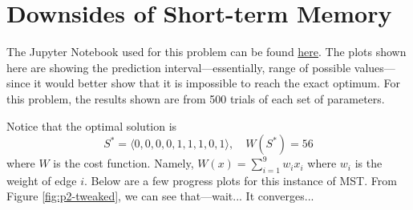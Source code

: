 \section{Downsides of Short-term Memory}

The Jupyter Notebook used for this problem can be found \href{https://github.com/nngerncham/ma395_heuristic/blob/main/homework/hw3/codebase/Notebooks/Problem\%202.ipynb}{here}. The plots shown here are showing the prediction interval---essentially, range of possible values---since it would better show that it is impossible to reach the exact optimum. For this problem, the results shown are from 500 trials of each set of parameters.

Notice that the optimal solution is
\[
    S^* = \langle 0, 0, 0, 0, 1, 1, 1, 0, 1 \rangle,\quad W(S^*) = 56
\]
where \(W\) is the cost function. Namely, \(W(x) = \sum_{i=1}^9 w_i x_i\) where \(w_i\) is the weight of edge \(i\). Below are a few progress plots for this instance of MST. From Figure \ref{fig:p2-tweaked}, we can see that---wait... It converges...

